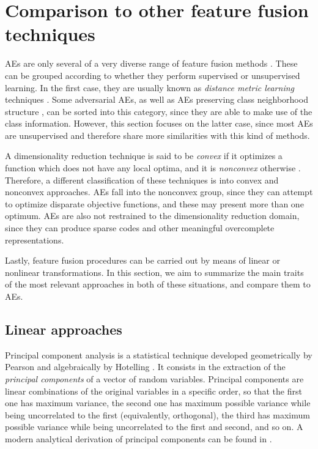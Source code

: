 \section{Comparison to other feature fusion techniques}\label{Sec.Relationship}

AEs are only several of a very diverse range of feature fusion methods \cite{FeatureFusion}. These can be grouped according to whether they perform supervised or unsupervised learning. In the first case, they are usually known as \textit{distance metric learning} techniques \cite{DistanceMetric}. Some adversarial AEs, as well as AEs preserving class neighborhood structure \cite{NonlinearEmbeddingNN}, can be sorted into this category, since they are able to make use of the class information. However, this section focuses on the latter case, since most AEs are unsupervised and therefore share more similarities with this kind of methods.

A dimensionality reduction technique is said to be \textit{convex} if it optimizes a function which does not have any local optima, and it is \textit{nonconvex} otherwise \cite{DimRecComparative}. Therefore, a different classification of these techniques is into convex and nonconvex approaches. AEs fall into the nonconvex group, since they can attempt to optimize disparate objective functions, and these may present more than one optimum. AEs are also not restrained to the dimensionality reduction domain, since they can produce sparse codes and other meaningful overcomplete representations.

Lastly, feature fusion procedures can be carried out by means of linear or nonlinear transformations. In this section, we aim to summarize the main traits of the most relevant approaches in both of these situations, and compare them to AEs. 

\subsection{Linear approaches}

Principal component analysis is a statistical technique developed geometrically by Pearson \cite{PCA} and algebraically by Hotelling \cite{PCAHotelling}. It consists in the extraction of the \textit{principal components} of a vector of random variables. Principal components are linear combinations of the original variables in a specific order, so that the first one has maximum variance, the second one has maximum possible variance while being uncorrelated to the first (equivalently, orthogonal), the third has maximum possible variance while being uncorrelated to the first and second, and so on. A modern analytical derivation of principal components can be found in \cite{PCABook}.

